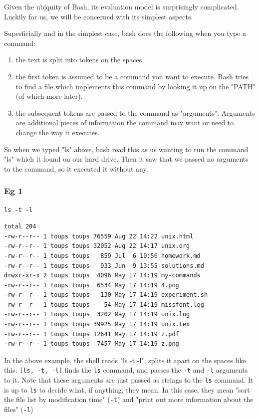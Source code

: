 \documentclass[11pt]{article}
\begin{document}
Given the ubiquity of Bash, its evaluation model is surprisingly
complicated. Luckily for us, we will be concerned with its simplest
aspects.

Superficially and in the simplest case, bash does the following when
you type a command:

\begin{enumerate}
\item the text is split into tokens on the spaces
\item the first token is assumed to be a command you want to
execute. Bash tries to find a file which implements this command by
looking it up on the "PATH" (of which more later).
\item the subsequent tokens are passed to the command as
"arguments". Arguments are additional pieces of information the
command may want or need to change the way it executes.
\end{enumerate}

So when we typed "ls" above, bash read this as us wanting to run the
command "ls" which it found on our hard drive. Then it saw that we
passed no arguments to the command, so it executed it without any.

\subsubsection{Eg 1}
\label{sec:org2bfc435}

\begin{verbatim}
ls -t -l
\end{verbatim}

\begin{verbatim}
total 204
-rw-r--r-- 1 toups toups 76559 Aug 22 14:22 unix.html
-rw-r--r-- 1 toups toups 32052 Aug 22 14:17 unix.org
-rw-r--r-- 1 toups toups   859 Jul  6 10:56 homework.md
-rw-r--r-- 1 toups toups   933 Jun  9 13:55 solutions.md
drwxr-xr-x 2 toups toups  4096 May 17 14:19 my-commands
-rw-r--r-- 1 toups toups  6534 May 17 14:19 4.png
-rw-r--r-- 1 toups toups   130 May 17 14:19 experiment.sh
-rw-r--r-- 1 toups toups    54 May 17 14:19 missfont.log
-rw-r--r-- 1 toups toups  3202 May 17 14:19 unix.log
-rw-r--r-- 1 toups toups 39925 May 17 14:19 unix.tex
-rw-r--r-- 1 toups toups 12641 May 17 14:19 z.pdf
-rw-r--r-- 1 toups toups  7457 May 17 14:19 z.png
\end{verbatim}

In the above example, the shell reads "ls -t -l", splits it apart on
the spaces like this: \texttt{[ls, -t, -l]} finds the \texttt{ls} command, and
passes the \texttt{-t} and \texttt{-l} arguments to it. Note that these arguments
are just passed as strings to the \texttt{ls} command. It is up to \texttt{ls} to
decide what, if anything, they mean. In this case, they mean "sort the
file list by modification time" (\texttt{-t}) and "print out more information
about the files" (\texttt{-l})
\end{document}
